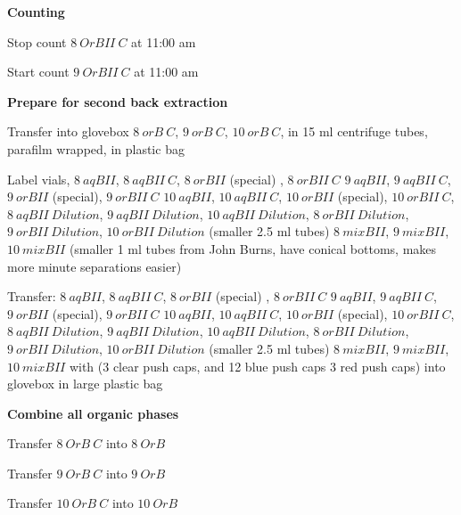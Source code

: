 \documentclass[idxtotoc,hyperref,openany,oneside]{labbook} %
\newcommand{\cmark}{\ding{51}}%
\newcommand{\done}{\rlap{$\square$}{\raisebox{2pt}{\large\hspace{1pt}\cmark}}%
  \hspace{-2.5pt}}
\begin{document}
\textbf{Counting}
\begin{todolist}
\item[\done]{Stop count $\boxed{8\ OrBII\ C}$ at 11:00 am}
\item[\done]{Start count $\boxed{9\ OrBII\ C}$ at 11:00 am}
\end{todolist}


\textbf{Prepare for second back extraction}
\begin{todolist}
\item[\done]{Transfer into glovebox $\boxed{8\ orB\ C}$,
  $\boxed{9\ orB\ C}$, $\boxed{10\ orB\ C}$,
  in 15 ml centrifuge tubes, parafilm wrapped, in plastic bag}
\item[\done]{Label vials,
  $\boxed{8\ aqBII}$,
  $\boxed{8\ aqBII\ C}$,  $\boxed{8\ orBII}$ (special) \smiley,
  $\boxed{8\ orBII\ C}$
  $\boxed{9\ aqBII}$,
  $\boxed{9\ aqBII\ C}$,  $\boxed{9\ orBII}$ (special),
  $\boxed{9\ orBII\ C}$
  $\boxed{10\ aqBII}$, $\boxed{10\ aqBII\ C}$,
  $\boxed{10\ orBII}$ (special),
  $\boxed{10\ orBII\ C}$,
  $\boxed{8\ aqBII\ Dilution}$,
  $\boxed{9\ aqBII\ Dilution}$,
  $\boxed{10\ aqBII\ Dilution}$,
  $\boxed{8\ orBII\ Dilution}$,
  $\boxed{9\ orBII\ Dilution}$,
  $\boxed{10\ orBII\ Dilution}$ (smaller 2.5 ml tubes)
  $\boxed{8\ mixBII}$, $\boxed{9\ mixBII}$,
    $\boxed{10\ mixBII}$ (smaller 1 ml tubes from John Burns,
    have conical bottoms, makes more minute separations easier)}

\item[\done]{Transfer:   $\boxed{8\ aqBII}$,
  $\boxed{8\ aqBII\ C}$,  $\boxed{8\ orBII}$ (special) \smiley,
  $\boxed{8\ orBII\ C}$
  $\boxed{9\ aqBII}$,
  $\boxed{9\ aqBII\ C}$,  $\boxed{9\ orBII}$ (special),
  $\boxed{9\ orBII\ C}$
  $\boxed{10\ aqBII}$, $\boxed{10\ aqBII\ C}$,
  $\boxed{10\ orBII}$ (special),
  $\boxed{10\ orBII\ C}$,
  $\boxed{8\ aqBII\ Dilution}$,
  $\boxed{9\ aqBII\ Dilution}$,
  $\boxed{10\ aqBII\ Dilution}$,
  $\boxed{8\ orBII\ Dilution}$,
  $\boxed{9\ orBII\ Dilution}$,
  $\boxed{10\ orBII\ Dilution}$ (smaller 2.5 ml tubes)
  $\boxed{8\ mixBII}$, $\boxed{9\ mixBII}$,
    $\boxed{10\ mixBII}$
  with
  (3 clear push caps, and 12 blue push caps
  3 red push caps) into glovebox in large plastic bag}
\end{todolist}
\textbf{Combine all organic phases}

\begin{todolist}  
\item[\done]{Transfer $\boxed{8\ OrB\ C}$ into $\boxed{8\ OrB}$}
\item[\done]{Transfer $\boxed{9\ OrB\ C}$ into $\boxed{9\ OrB}$}
\item[\done]{Transfer $\boxed{10\ OrB\ C}$ into $\boxed{10\ OrB}$}
\end{todolist}
  
\end{document}
